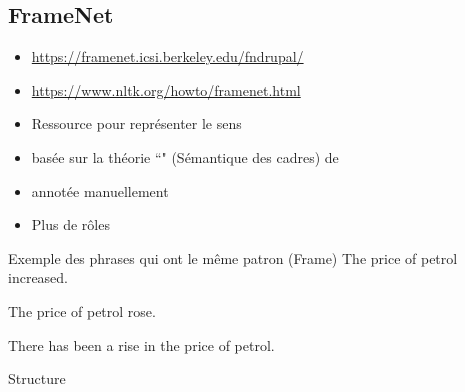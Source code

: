 \documentclass{KodeBook}
\begin{document}
\subsection{FrameNet}

\begin{minipage}{.68\textwidth}
	\begin{itemize}
		\item {\scriptsize \url{https://framenet.icsi.berkeley.edu/fndrupal/}}
		\item {\scriptsize \url{https://www.nltk.org/howto/framenet.html}}
		\item Ressource pour représenter le sens 
		\item basée sur la théorie ``" (Sémantique des cadres) de 
		\item annotée manuellement
		\item Plus de rôles
	\end{itemize}
\end{minipage}
\begin{minipage}{.3\textwidth}
\end{minipage}

\begin{exampleblock}{Exemple des phrases qui ont le même patron (Frame)}
	The price of petrol increased.
	
	The price of petrol rose.
	
	There has been a rise in the price of petrol.
\end{exampleblock}

Structure
\end{document}

